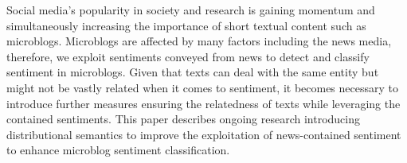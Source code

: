 Social media's popularity in society and research is gaining momentum and simultaneously increasing the importance of short textual content such as microblogs. Microblogs are affected by many factors including the news media, therefore, we exploit sentiments conveyed from news to detect and classify sentiment in microblogs. Given that texts can deal with the same entity but might not be vastly related when it comes to sentiment, it becomes necessary to introduce further measures ensuring the relatedness of texts while leveraging the contained sentiments. This paper describes ongoing research introducing distributional semantics to improve the exploitation of news-contained sentiment to enhance microblog sentiment classification.
